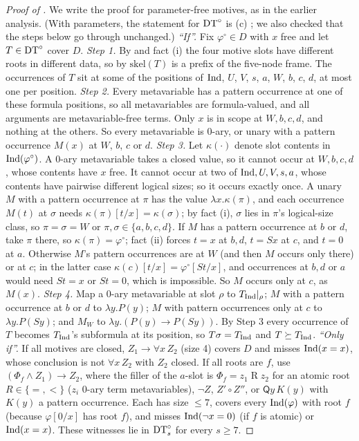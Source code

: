 \begin{proof}[Proof of ]
We write the proof for parameter-free motives, as in the earlier analysis. (With parameters, the statement for $\mathrm{DT}^{\circ}$
is (c) ; we also checked that the steps below go through unchanged.)
\emph{``If''.} Fix $\varphi^\circ\in D$ with $x$ free \evN{} and let $T\in\mathrm{DT}^{\circ}$ cover $D$.
\emph{Step 1.} By \evR{} and fact (i) the four motive slots have different roots in different data, so by
 $\mathrm{skel}(T)$ is a prefix of the five-node frame. The occurrences of $T$ sit at some of the
positions of $\mathrm{Ind}$, $U$, $V$, $s$, $a$, $W$, $b$, $c$, $d$, at most one per position.
\emph{Step 2.} Every metavariable has a pattern occurrence at one of these formula positions, so all metavariables are
formula-valued, and all arguments are metavariable-free terms. Only $x$ is in scope at $W,b,c,d$, and nothing at the
others. So every metavariable is 0-ary, or unary with a pattern occurrence $M(x)$ at $W$, $b$, $c$ or $d$.
\emph{Step 3.} Let $\kappa(\cdot)$ denote slot contents in $\mathrm{Ind}(\varphi^\circ)$. A 0-ary metavariable takes a closed
value, so it cannot occur at $W,b,c,d$, whose contents have $x$ free. It cannot occur at two of $\mathrm{Ind},U,V,s,a$, whose
contents have pairwise different logical sizes; so it occurs exactly once. A unary $M$ with a pattern occurrence at $\pi$
has the value $\lambda x.\kappa(\pi)$, and each occurrence $M(t)$ at $\sigma$ needs $\kappa(\pi)[t/x]=\kappa(\sigma)$; by
fact (i), $\sigma$ lies in $\pi$'s logical-size class, so $\pi=\sigma=W$ or $\pi,\sigma\in\{a,b,c,d\}$. If $M$ has a pattern
occurrence at $b$ or $d$, take $\pi$ there, so $\kappa(\pi)=\varphi^\circ$; fact (ii) forces $t=x$ at $b,d$, $t=Sx$ at $c$,
and $t=0$ at $a$. Otherwise $M$'s pattern occurrences are at $W$ (and then $M$ occurs only there) or at $c$; in the latter
case $\kappa(c)[t/x]=\varphi^\circ[St/x]$, and occurrences at $b,d$ or $a$ would need $St=x$ or $St=0$, which is impossible.
So $M$ occurs only at $c$, as $M(x)$.
\emph{Step 4.} Map a 0-ary metavariable at slot $\rho$ to $T_{\mathrm{Ind}}|_\rho$; $M$ with a pattern occurrence at $b$ or $d$ to
$\lambda y.P(y)$; $M$ with pattern occurrences only at $c$ to $\lambda y.P(Sy)$; and $M_W$ to $\lambda y.(P(y)\to P(Sy))$.
By Step 3 every occurrence of $T$ becomes $T_{\mathrm{Ind}}$'s subformula at its position, so $T\sigma=T_{\mathrm{Ind}}$ and $T\succeq T_{\mathrm{Ind}}$.
\emph{``Only if''.} If all motives are closed, $Z_1\to\forall x\,Z_2$ (size 4) covers $D$ and misses $\mathrm{Ind}(x=x)$, whose
conclusion is not $\forall x\,Z_2$ with $Z_2$ closed. If all roots are $f$, use $(\Phi_f\wedge Z_1)\to Z_2$, where the
filler of the $a$-slot is $\Phi_f=z_1\mathbin{R}z_2$ for an atomic root $R\in\{=,<\}$ ($z_i$ 0-ary term metavariables),
$\neg Z$, $Z'\circ Z''$, or $\mathsf Qy\,K(y)$ with $K(y)$ a pattern occurrence. Each has size $\le7$, covers every
$\mathrm{Ind}(\varphi)$ with root $f$ (because $\varphi[0/x]$ has root $f$), and misses $\mathrm{Ind}(\neg x=0)$ (if $f$ is atomic) or
$\mathrm{Ind}(x=x)$. These witnesses lie in $\mathrm{DT}^{\circ}_s$ for every $s\ge7$.
\end{proof}

